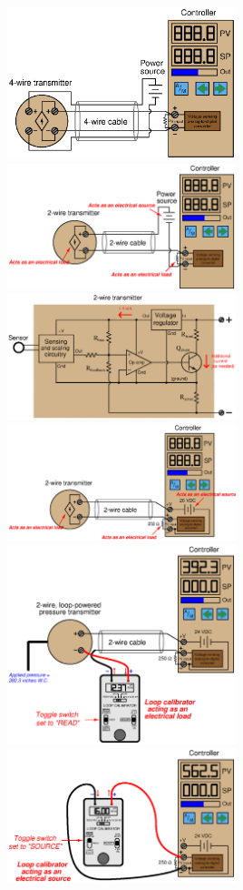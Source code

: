 \documentclass[10pt,a5paper]{article}
\begin{document}
\includegraphics[width=0.5\textwidth]{current10.eps}
\includegraphics[width=0.5\textwidth]{current11.eps}
\includegraphics[width=0.5\textwidth]{current12.eps}
\includegraphics[width=0.5\textwidth]{current13.eps}
\includegraphics[width=0.5\textwidth]{current29.eps}
\includegraphics[width=0.5\textwidth]{current30.eps}
\end{document}
